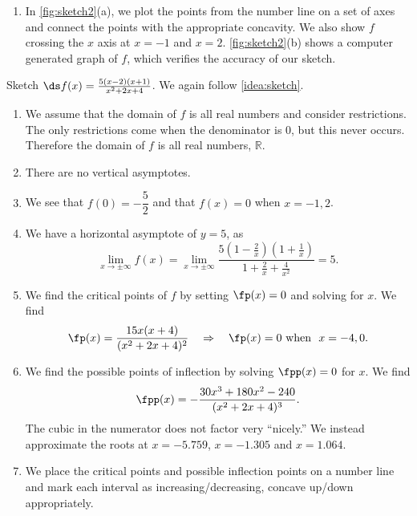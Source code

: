 \begin{example}
\begin{enumerate}
\begin{center}
\end{center}
		
	\item	In \autoref{fig:sketch2}(a), we plot the points from the number line on a set of axes and connect the points with the appropriate concavity. We also show $f$ crossing the $x$ axis at $x=-1$ and $x=2$. \autoref{fig:sketch2}(b) shows a computer generated graph of $f$, which verifies the accuracy of our sketch.
\end{enumerate}
\end{example}

\begin{example}\label{ex_sketch3}
Sketch $\ds f(x) = \frac{5(x-2)(x+1)}{x^2+2x+4}$.
\solution
We again follow \autoref{idea:sketch}.
	\begin{enumerate}
	\item	We assume that the domain of $f$ is all real numbers and consider restrictions. The only restrictions come when the denominator is 0, but this never occurs. Therefore the domain of $f$ is all real numbers, $\mathbb{R}$.
	\item	There are no vertical asymptotes.
	\item	We see that $f(0)=-\dfrac52$ and that $f(x)=0$ when $x=-1,2$.
	\item	We have a horizontal asymptote of $y=5$, as
	\[\lim_{x\to\pm\infty}f(x)=\lim_{x\to\pm\infty}\frac{5(1-\frac2x)(1+\frac1x)}{1+\frac2x+\frac4{x^2}}=5.\]
	\item	We find the critical points of $f$ by setting $\fp(x)=0$ and solving for $x$. We find 
	\[
	\fp(x) = \frac{15x(x+4)}{(x^2+2x+4)^2}
	\quad \Rightarrow \quad
	\fp(x) = 0 \text{ when } \ x=-4,0.
	\]
	\item	We find the possible points of inflection by solving $\fpp(x) = 0$ for $x$. We find
	\[\fpp(x) = -\frac{30x^3+180x^2-240}{(x^2+2x+4)^3}.\]
	The cubic in the numerator does not factor very ``nicely.'' We instead approximate the roots at $x= -5.759$, $x=-1.305$ and $x=1.064$.
			
	\item	We place the critical points and possible inflection points on a number line and mark each interval as increasing/decreasing, concave up/down appropriately.

\begin{center}
\end{center}	


\end{enumerate}
\end{example}

